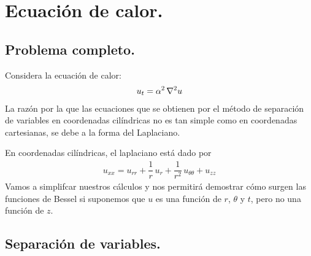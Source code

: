 \documentclass[12pt]{article}
\numberwithin{equation}{section}
\begin{document}
\section{Ecuación de calor.}
\subsection{Problema completo.}

Considera la ecuación de calor:
\begin{align*}
u_{t} =  \alpha^{2} \,  \laplacian{u}
\end{align*}
La razón por la que las ecuaciones que se obtienen por el método de separación de variables en coordenadas cilíndricas no es tan simple como en coordenadas cartesianas, se debe a la forma del Laplaciano. 
\par
En coordenadas cilíndricas, el laplaciano está dado por
\begin{align*}
u_{xx} = u_{rr} + \dfrac{1}{r} \, u_{r} + \dfrac{1}{r^{2}} \, u_{\theta \theta} + u_{zz}
\end{align*}
Vamos a simplifcar nuestros cálculos y nos permitirá demostrar cómo surgen las funciones de Bessel si suponemos que $u$ es una función de $r$, $\theta$ y $t$, pero no una función de $z$.

\subsection{Separación de variables.}
\end{document}
